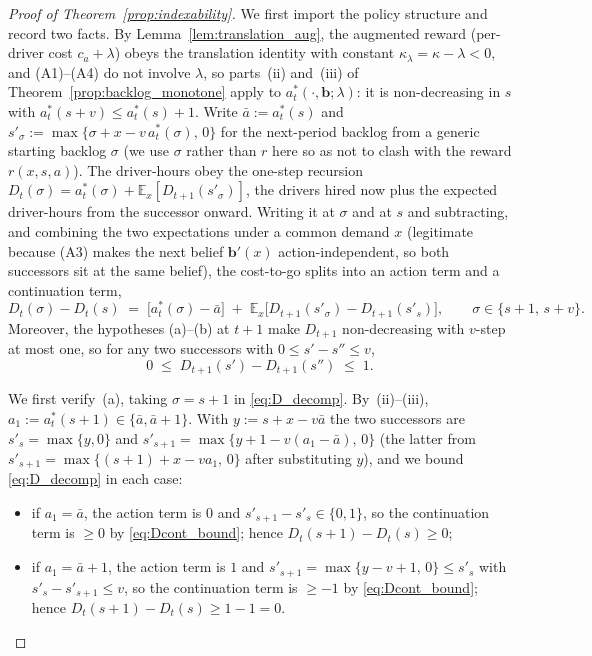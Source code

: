 \documentclass[preprint,11pt,authoryear]{elsarticle}
\newcommand{\bvec}[1]{\mathbf{#1}}
\theoremstyle{remark}
\begin{document}
\begin{proof}[Proof of Theorem~\ref{prop:indexability}]
We first import the policy structure and record two facts. By Lemma~\ref{lem:translation_aug}, the augmented reward (per-driver cost $c_a + \lambda$) obeys the translation identity with constant $\kappa_\lambda = \kappa - \lambda < 0$, and (A1)--(A4) do not involve $\lambda$, so parts~(ii) and~(iii) of Theorem~\ref{prop:backlog_monotone} apply to $a^*_t(\cdot, \bvec{b}; \lambda)$: it is non-decreasing in $s$ with $a^*_t(s+v) \le a^*_t(s) + 1$. Write $\bar{a} := a^*_t(s)$ and $s'_\sigma := \max\{\sigma + x - v\,a^*_t(\sigma),\, 0\}$ for the next-period backlog from a generic starting backlog $\sigma$ (we use $\sigma$ rather than $r$ here so as not to clash with the reward $r(x,s,a)$). The driver-hours obey the one-step recursion $D_t(\sigma) = a^*_t(\sigma) + \mathbb{E}_x[D_{t+1}(s'_\sigma)]$, the drivers hired now plus the expected driver-hours from the successor onward. Writing it at $\sigma$ and at $s$ and subtracting, and combining the two expectations under a common demand $x$ (legitimate because (A3) makes the next belief $\bvec{b}'(x)$ action-independent, so both successors sit at the same belief), the cost-to-go splits into an action term and a continuation term,
\begin{equation}
D_t(\sigma) - D_t(s) \;=\; \bigl[a^*_t(\sigma) - \bar a\bigr] \;+\; \mathbb{E}_x\bigl[D_{t+1}(s'_{\sigma}) - D_{t+1}(s'_s)\bigr], \qquad \sigma \in \{s+1,\, s+v\}.
\label{eq:D_decomp}
\end{equation}
Moreover, the hypotheses (a)--(b) at $t+1$ make $D_{t+1}$ non-decreasing with $v$-step at most one, so for any two successors with $0 \le s' - s'' \le v$,
\begin{equation}
0 \;\le\; D_{t+1}(s') - D_{t+1}(s'') \;\le\; 1.
\label{eq:Dcont_bound}
\end{equation}

We first verify~(a), taking $\sigma = s+1$ in \eqref{eq:D_decomp}. By~(ii)--(iii), $a_1 := a^*_t(s+1) \in \{\bar a, \bar a+1\}$. With $y := s + x - v\bar a$ the two successors are $s'_s = \max\{y, 0\}$ and $s'_{s+1} = \max\{y + 1 - v(a_1 - \bar a),\, 0\}$ (the latter from $s'_{s+1} = \max\{(s+1)+x - v a_1,\, 0\}$ after substituting $y$), and we bound \eqref{eq:D_decomp} in each case:
\begin{itemize}
\item if $a_1 = \bar a$, the action term is $0$ and $s'_{s+1} - s'_s \in \{0,1\}$, so the continuation term is $\ge 0$ by \eqref{eq:Dcont_bound}; hence $D_t(s+1) - D_t(s) \ge 0$;
\item if $a_1 = \bar a + 1$, the action term is $1$ and $s'_{s+1} = \max\{y - v + 1,\, 0\} \le s'_s$ with $s'_s - s'_{s+1} \le v$, so the continuation term is $\ge -1$ by \eqref{eq:Dcont_bound}; hence $D_t(s+1) - D_t(s) \ge 1 - 1 = 0$.
\end{itemize}


\end{proof}
\end{document}

